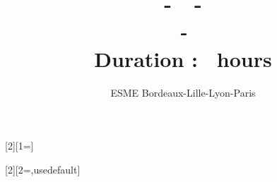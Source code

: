 \usepackage{fancyhdr}
\pagestyle{fancy}
\fancyhf{}
\renewcommand{\headrulewidth}{0pt}
\fancyfoot[LO,RE]{\textbf{\thepage}} 
\fancyfoot[C]{\epreuve~-~\promo~-~\annee~-~\module}

\usepackage{tikz}
\newcommand{\feuilleDR}[1]{%
\begin{tikzpicture}
    \draw[gray!30](0,0)grid[step=0.5cm](\linewidth,#1);
\end{tikzpicture}}%
\usepackage{xargs}
\usepackage{ifthen}

\setcounter{numques}{0}
[2][1=]{
\addtocounter{numques}{1}
\hfill\break\noindent{\normalfont#1\bfseries Q\thenumques.\xspace\normalfont\normalcolor~#2\\[0.2cm]}
}
[2][2=\Large,usedefault]{%
    \setcounter{numques}{0}
    \addtocounter{numexos}{1}
    {\bigskip{}\\[0.2cm]}
    {\bigskip{}\\[0.2cm]}
}%
\title{\textsc{\annee~-~\promo~-~\module}\\
\emph{\epreuve~-~\titreEval}\\ 
Duration : \dureeEval~hours}
\author{ESME Bordeaux-Lille-Lyon-Paris}        
\date{}
